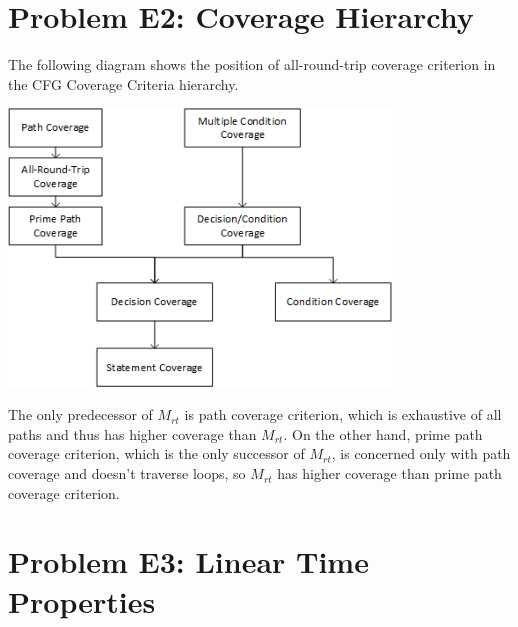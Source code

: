 \documentclass[]{article}
\begin{document}
\section{Problem E2: Coverage Hierarchy}
The following diagram shows the position of all-round-trip coverage criterion in the CFG Coverage Criteria hierarchy.

\begin{center}
	\includegraphics[height=2.9in]{E2}
\end{center}

The only predecessor of $M_{rt}$ is path coverage criterion, which is exhaustive of all paths and thus has higher coverage than $M_{rt}$. On the other hand, prime path coverage criterion, which is the only successor of $M_{rt}$, is concerned only with path coverage and doesn't traverse loops, so $M_{rt}$ has higher coverage than prime path coverage criterion.

\section{Problem E3: Linear Time Properties}
\end{document}
